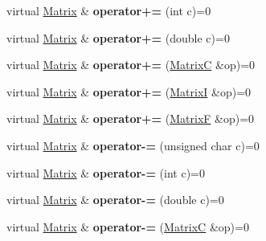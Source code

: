 \begin{DoxyCompactItemize}
\item 
\hypertarget{class_matrix_a0ade50eba7e962c0d2f43225621a01ba}{virtual \hyperlink{class_matrix}{Matrix} \& {\bfseries operator+=} (int c)=0}\label{class_matrix_a0ade50eba7e962c0d2f43225621a01ba}

\item 
\hypertarget{class_matrix_af7e3980439b3723efa3208c2c1c44b88}{virtual \hyperlink{class_matrix}{Matrix} \& {\bfseries operator+=} (double c)=0}\label{class_matrix_af7e3980439b3723efa3208c2c1c44b88}

\item 
\hypertarget{class_matrix_aa50ff68f26903f3825dd9b47e0f8ee55}{virtual \hyperlink{class_matrix}{Matrix} \& {\bfseries operator+=} (\hyperlink{class_matrix_c}{Matrix\+C} \&op)=0}\label{class_matrix_aa50ff68f26903f3825dd9b47e0f8ee55}

\item 
\hypertarget{class_matrix_aea82cf08158d2a6b582e7f899aa1c427}{virtual \hyperlink{class_matrix}{Matrix} \& {\bfseries operator+=} (\hyperlink{class_matrix_i}{Matrix\+I} \&op)=0}\label{class_matrix_aea82cf08158d2a6b582e7f899aa1c427}

\item 
\hypertarget{class_matrix_ab1e1b3aad23ac73e30e61642c2a183c7}{virtual \hyperlink{class_matrix}{Matrix} \& {\bfseries operator+=} (\hyperlink{class_matrix_f}{Matrix\+F} \&op)=0}\label{class_matrix_ab1e1b3aad23ac73e30e61642c2a183c7}

\item 
\hypertarget{class_matrix_abbe204f5d721c900aed5237916835649}{virtual \hyperlink{class_matrix}{Matrix} \& {\bfseries operator-\/=} (unsigned char c)=0}\label{class_matrix_abbe204f5d721c900aed5237916835649}

\item 
\hypertarget{class_matrix_aa75f2449f6a571aee92be2606e05f340}{virtual \hyperlink{class_matrix}{Matrix} \& {\bfseries operator-\/=} (int c)=0}\label{class_matrix_aa75f2449f6a571aee92be2606e05f340}

\item 
\hypertarget{class_matrix_a2efe9706e9cb921ffd22aae5e91ea85d}{virtual \hyperlink{class_matrix}{Matrix} \& {\bfseries operator-\/=} (double c)=0}\label{class_matrix_a2efe9706e9cb921ffd22aae5e91ea85d}

\item 
\hypertarget{class_matrix_a7dd23a5ea467969fbc88e40cba568be1}{virtual \hyperlink{class_matrix}{Matrix} \& {\bfseries operator-\/=} (\hyperlink{class_matrix_c}{Matrix\+C} \&op)=0}\label{class_matrix_a7dd23a5ea467969fbc88e40cba568be1}


\end{DoxyCompactItemize}
